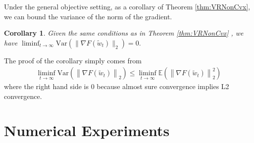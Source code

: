 \documentclass[twoside]{article}
\def\EE{\mathbb{E}}
\newtheorem{corollary}{Corollary}
\begin{document}
Under the general objective setting, as a corollary of Theorem \ref{thm:VRNonCvx}, we can bound the variance of the norm of the gradient.
\begin{corollary}
\label{cor:ConvVar}
Given the same conditions as in Theorem \ref{thm:VRNonCvx} , we have $\liminf_{t\to\infty} \mathrm{Var}\left(\|\nabla F(\widetilde w_t)\|_2\right) = 0.\nonumber$
\end{corollary}
The proof of the corollary simply comes from 
\begin{eqnarray}
\liminf_{t\to\infty} \mathrm{Var}(\left\|\nabla F(\widetilde w_t)\right\|_2) \leq \liminf_{t\to\infty} \EE(\left\|\nabla F(\widetilde w_t)\right\|_2^2)\nonumber
\end{eqnarray}
where the right hand side is $0$ because almost sure convergence implies L2 convergence. 
\section{Numerical Experiments}
\end{document}
